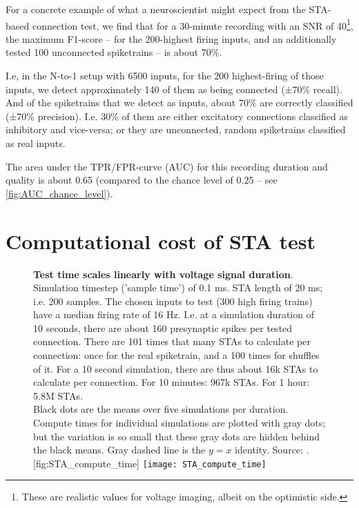 For a concrete example of what a neuroscientist might expect from the STA-based connection test, we find that for a 30-minute recording with an SNR of 40\footnote{These are realistic values for voltage imaging, albeit on the optimistic side.},
the maximum F1-score -- for the 200-highest firing inputs, and an additionally tested 100 unconnected spiketrains -- is about 70\%.

I.e, in the N-to-1 setup with 6500 inputs, for the 200 highest-firing of those inputs, we detect approximately 140 of them as being connected (±70\% recall). And of the spiketrains that we detect as inputs, about 70\% are correctly classified  (±70\% precision). I.e. 30\% of them are either excitatory connections classified as inhibitory and vice-versa; or they are unconnected, random spiketrains classified as real inputs.

The area under the TPR/FPR-curve (AUC) for this recording duration and quality is about 0.65 (compared to the chance level of 0.25 -- see \cref{fig:AUC_chance_level}).



\FloatBarrier
\section{Computational cost of STA test}

\begin{figure}
    \begin{sidecaption}
        {\textbf{Test time scales linearly with voltage signal duration}.\\
        Simulation timestep ('sample time') of 0.1 ms. STA length of 20 ms; i.e. 200 samples.
        The chosen inputs to test (300 high firing trains) have a median firing rate of 16 Hz. I.e. at a simulation duration of 10 seconds, there are about 160 presynaptic spikes per tested connection. There are 101 times that many STAs to calculate per connection: once for the real spiketrain, and a 100 times for shuffles of it. For a 10 second simulation, there are thus about 16k STAs to calculate per connection.
        For 10 minutes: 967k STAs. For 1 hour: 5.8M STAs.\\
        Black dots are the means over five simulations per duration. Compute times for individual simulations are plotted with gray dots; but the variation is so small that these gray dots are hidden behind the black means. Gray dashed line is the $y = x$ identity.  Source: .}
        [fig:STA_compute_time]
        \texttt{[image: STA\_compute\_time]}
    \end{sidecaption}
\end{figure}
